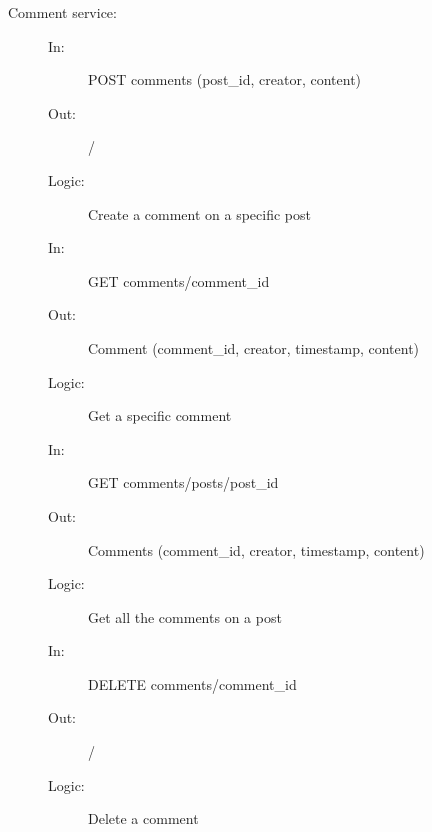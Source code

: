 \documentclass{article}
\begin{document}
\begin{description}
    \item [Comment service:]
    \begin{description}
        \item[]
        \item[In:] POST comments (post\_id, creator, content)
        \item[Out:] /
        \item[Logic:] Create a comment on a specific post
        \item[]
        
        \item[In:] GET comments/comment\_id
        \item[Out:] Comment (comment\_id, creator, timestamp, content)
        \item[Logic:] Get a specific comment
        \item[]

        \item[In:] GET comments/posts/post\_id
        \item[Out:] Comments (comment\_id, creator, timestamp, content)
        \item[Logic:] Get all the comments on a post
        \item[]
        
        \item[In:] DELETE comments/comment\_id
        \item[Out:] /
        \item[Logic:] Delete a comment
        \item[]
    \end{description}
\end{description}
\end{document}
